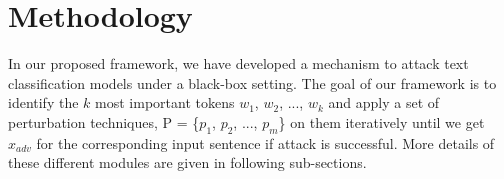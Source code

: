\documentclass[sigconf]{acmart}
\begin{document}
\section{Methodology}
In our proposed framework, we have developed a mechanism to attack text classification models under a black-box setting.
The goal of our framework is to identify the $k$ most important tokens $w_{1}$, $w_{2}$, ..., $w_{k}$ and apply a set of perturbation techniques, P = \{$p_{1}$, $p_{2}$, ..., $p_{m}$\} on them iteratively until we get $x_{adv}$ for the corresponding input sentence if attack is successful. More details of these different modules are given in following sub-sections. 
\end{document}

